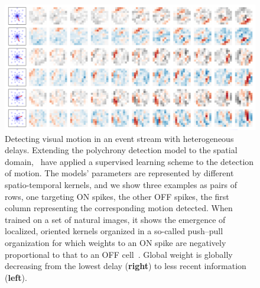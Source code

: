 \documentclass[brainsci, %
               review,accept,pdftex,moreauthors
               ]{Definitions/mdpi}
\begin{document}
\begin{figure}[H]%
  \includegraphics[width=0.98\linewidth]{figures/2022-09-27_MotionDetection_kernel.png}
    \caption{
      Detecting visual motion in an event stream with heterogeneous delays.
      Extending the polychrony detection model to the spatial domain,~\citet{grimaldi_learning_2022} have applied a supervised learning scheme to the detection of motion. The models' parameters are represented by different spatio-temporal kernels, and we show three examples as pairs of rows, one targeting ON spikes, the other OFF spikes, the first column representing the corresponding motion detected. When trained on a set of natural images, it shows the emergence of localized, oriented kernels organized in a so-called push--pull organization for which weights to an ON spike are negatively proportional to that to an OFF cell~\citep{kremkow_push-pull_2016}. Global weight is globally decreasing from the lowest delay (\textbf{right}) to less recent information (\textbf{left}).
     }
  \label{fig:icip}
\end{figure}

%
\end{document}
